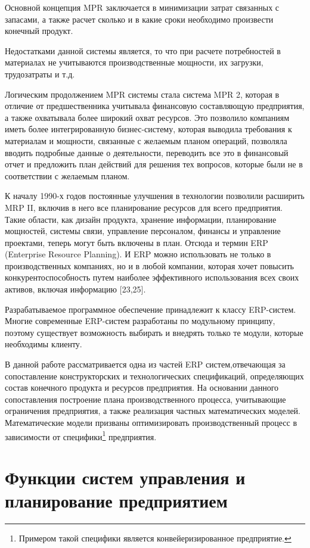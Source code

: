 Основной концепция MPR заключается в минимизации затрат связанных с запасами, а также расчет сколько и в какие сроки необходимо произвести конечный продукт. 

Недостатками данной системы является, то что при расчете потребностей в материалах не учитываются производственные мощности, их загрузки, трудозатраты и т.д. 

Логическим продолжением MPR системы стала система MPR 2, которая в отличие от предшественника учитывала финансовую составляющую предприятия, а также охватывала более широкий охват ресурсов. Это позволило компаниям иметь более интегрированную бизнес-систему, которая выводила требования к материалам и мощности, связанные с желаемым планом операций, позволяла вводить подробные данные о деятельности, переводить все это в финансовый отчет и предложить план действий для решения тех вопросов, которые были не в соответствии с желаемым планом.

К началу 1990-х годов постоянные улучшения в технологии позволили расширить MRP II, включив в него все планирование ресурсов для всего предприятия. Такие области, как дизайн продукта, хранение информации, планирование мощностей, системы связи, управление персоналом, финансы и управление проектами, теперь могут быть включены в план. Отсюда и термин ERP (Enterprise Resource Planning). И ERP можно использовать не только в производственных компаниях, но и в любой компании, которая хочет повысить конкурентоспособность путем наиболее эффективного использования всех своих активов, включая информацию \cite{ptak_schragenheim_2004} [23,25].

Разрабатываемое программное обеспечение принадлежит к классу ERP-систем. Многие современные ERP-систем разработаны по модульному принципу, поэтому существует возможность выбирать и внедрять только те модули, которые необходимы клиенту. 

В данной работе рассматривается одна из частей ERP систем,отвечающая за сопоставление конструкторских и технологических спецификаций, определяющих состав конечного продукта и ресурсов предприятия. На основании данного сопоставления построение плана производственного процесса, учитывающие ограничения предприятия, а также реализация частных математических моделей. Математические модели призваны оптимизировать производственный процесс в зависимости от специфики\footnote{Примером такой специфики является конвейеризированное предприятие.} предприятия.

\section{Функции систем управления и планирование предприятием}

